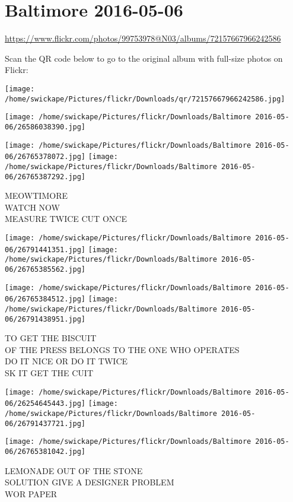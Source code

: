 \documentclass[10pt,letterpaper]{article}
\title{}
\author{}
\date{}
\begin{document}
\section*{Baltimore 2016-05-06}

\url{https://www.flickr.com/photos/99753978@N03/albums/72157667966242586}

Scan the QR code below to go to the original album with full-size photos on Flickr:

\texttt{[image: /home/swickape/Pictures/flickr/Downloads/qr/72157667966242586.jpg]}
\pagebreak

\texttt{[image: /home/swickape/Pictures/flickr/Downloads/Baltimore 2016-05-06/26586038390.jpg]}

\vspace{0.25in}
\texttt{[image: /home/swickape/Pictures/flickr/Downloads/Baltimore 2016-05-06/26765378072.jpg]}
\texttt{[image: /home/swickape/Pictures/flickr/Downloads/Baltimore 2016-05-06/26765387292.jpg]}

MEOWTIMORE\\
WATCH NOW\\
MEASURE TWICE CUT ONCE
\pagebreak

\texttt{[image: /home/swickape/Pictures/flickr/Downloads/Baltimore 2016-05-06/26791441351.jpg]}
\texttt{[image: /home/swickape/Pictures/flickr/Downloads/Baltimore 2016-05-06/26765385562.jpg]}

\texttt{[image: /home/swickape/Pictures/flickr/Downloads/Baltimore 2016-05-06/26765384512.jpg]}
\texttt{[image: /home/swickape/Pictures/flickr/Downloads/Baltimore 2016-05-06/26791438951.jpg]}

TO GET THE BISCUIT\\
OF THE PRESS BELONGS TO THE ONE WHO OPERATES\\
DO IT NICE OR DO IT TWICE\\
SK IT GET THE CUIT
\pagebreak

\texttt{[image: /home/swickape/Pictures/flickr/Downloads/Baltimore 2016-05-06/26254645443.jpg]}
\texttt{[image: /home/swickape/Pictures/flickr/Downloads/Baltimore 2016-05-06/26791437721.jpg]}

\texttt{[image: /home/swickape/Pictures/flickr/Downloads/Baltimore 2016-05-06/26765381042.jpg]}

LEMONADE OUT OF THE STONE\\
SOLUTION GIVE A DESIGNER PROBLEM\\
WOR PAPER
\pagebreak
\end{document}
